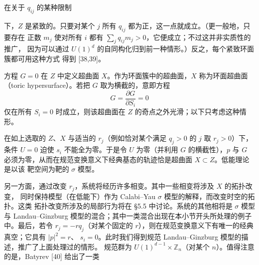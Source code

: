 在关于 $q_{ij}$ 的某种限制

\label{op:57}
下，$Z$ 是紧致的。只要对某个 $j$ 所有 $q_{ij}$ 都为正，这一点就成立。（更一般地，只要存在
正数 $m_j$ 使对所有 $i$ 都有 $\sum_j q_{ij}m_j>0$，它便成立；不过这并非实质性的推广，
因为可以通过 $U(1)^d$ 的自同构化归到前一种情形。）反之，每个紧致环面簇都可用这种方式
得到 [38,39]。

方程 $G=0$ 在 $Z$ 中定义超曲面 $X$。作为环面簇中的超曲面，$X$ 称为环面超曲面
（toric hypersurface）。若把 $G$ 取为横截的，意即方程
\begin{equation}
G=\frac{\partial G}{\partial S_i}=0
\tag{5.19}
\end{equation}
仅在所有 $S_i=0$ 时成立，则该超曲面在 $Z$ 的奇点之外光滑；以下只考虑这种情形。

在如上选取的 $Z$、$X$ 与适当的 $r_j$（例如恰对某个满足 $q_j>0$ 的 $j$ 取 $r_j>0$）下，
条件 $U=0$ 迫使 $s_i$ 不能全为零。于是令 $U$ 为零（并利用 $G$ 的横截性），$p$ 与 $G$
必须为零，从而在规范变换意义下经典基态的轨迹恰是超曲面 $X\subset Z$。低能理论是以该
靶空间为靶的 $\sigma$ 模型。

另一方面，通过改变 $r_j$，系统将经历许多相变。其中一些相变将涉及 $X$ 的拓扑改变，
同时保持模型（在低能下）作为 Calabi--Yau $\sigma$ 模型的解释，而改变时空的拓扑。这类
拓扑改变所涉及的局部行为将在 §5.5 中讨论。系统的其他相将是 $\sigma$ 模型与
Landau--Ginzburg 模型的混合；其中一类混合出现在本小节开头所处理的例子中。最后，若令
$r_j=-rq_j$（对某个固定的 $r$），则在规范变换意义下有唯一的经典真空；它具有 $|p|^2=r$、
$s_i=0$。此时我们得到规范 Landau--Ginzburg 模型的描述，推广了上面处理过的情形。
规范群为 $U(1)^{d-1}\times\mathbb{Z}_n$（对某个 $n$）。值得注意的是，Batyrev [40] 给出了一类%
